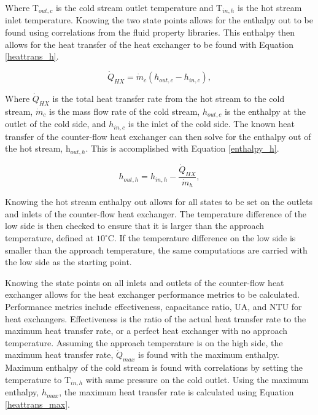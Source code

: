 \begin{paracol}{2}
Where T$_{out,c}$ is the cold stream outlet temperature and T$_{in,h}$ is the hot stream inlet temperature. Knowing the two state points allows for the enthalpy out to be found using correlations from the fluid property libraries. This enthalpy then allows for the heat transfer of the heat exchanger to be found with Equation \ref{heattrans_h}.

\begin{equation}
    \label{heattrans_h}
     \dot{Q}_{HX} = \dot{m}_{c}(h_{out,c}-h_{in,c}),
 \end{equation}

 Where $\dot{Q}_{HX}$ is the total heat transfer rate from the hot stream to the cold stream, $\dot{m}_{c}$ is the mass flow rate of the cold stream, $h_{out,c}$ is the enthalpy at the outlet of the cold side, and $h_{in,c}$ is the inlet of the cold side.
 The known heat transfer of the counter-flow heat exchanger can then solve for the enthalpy out of the hot stream, h$_{out,h}$. This is accomplished with Equation \ref{enthalpy_h}.

 \begin{equation}
    \label{enthalpy_h}
     h_{out,h} = h_{in,h} - \frac{\dot{Q}_{HX}}{\dot{m}_{h}},
 \end{equation}

Knowing the hot stream enthalpy out allows for all states to be set on the outlets and inlets of the counter-flow heat exchanger. The temperature difference of the low side is then checked to ensure that it is larger than the approach temperature, defined at $10^\circ$C. If the temperature difference on the low side is smaller than the approach temperature, the same computations are carried with the low side as the starting point.

Knowing the state points on all inlets and outlets of the counter-flow heat exchanger allows for the heat exchanger performance metrics to be calculated. Performance metrics include effectiveness, capacitance ratio, UA, and NTU for heat exchangers. Effectiveness is the ratio of the actual heat transfer rate to the maximum heat transfer rate, or a perfect heat exchanger with no approach temperature. Assuming the approach temperature is on the high side, the maximum heat transfer rate, $\dot{Q}_{max}$ is found with the maximum enthalpy. Maximum enthalpy of the cold stream is found with correlations by setting the temperature to T$_{in,h}$ with same pressure on the cold outlet. Using the maximum enthalpy, $h_{max}$, the maximum heat transfer rate is calculated using Equation \ref{heattrans_max}.


\end{paracol}
